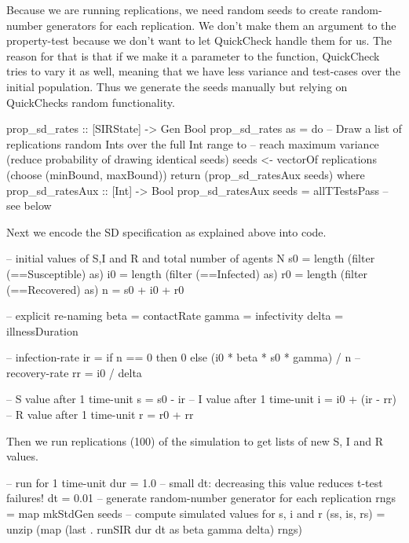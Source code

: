 Because we are running replications, we need random seeds to create random-number generators for each replication. We don't make them an argument to the property-test because we don't want to let QuickCheck handle them for us. The reason for that is that if we make it a parameter to the function, QuickCheck tries to vary it as well, meaning that we have less variance and test-cases over the initial population. Thus we generate the seeds manually but relying on QuickChecks random functionality.

\begin{HaskellCode}
prop_sd_rates :: [SIRState] -> Gen Bool
prop_sd_rates as = do
    -- Draw a list of replications random Ints over the full Int range to  
    -- reach maximum variance (reduce probability of drawing identical seeds)
    seeds <- vectorOf replications (choose (minBound, maxBound))
    return (prop_sd_ratesAux seeds)
  where
    prop_sd_ratesAux :: [Int] -> Bool
    prop_sd_ratesAux seeds = allTTestsPass -- see below
\end{HaskellCode}

Next we encode the SD specification as explained above into code.

\begin{HaskellCode}
-- initial values of S,I and R and total number of agents N
s0 = length (filter (==Susceptible) as)
i0 = length (filter (==Infected) as)
r0 = length (filter (==Recovered) as)
n  = s0 + i0 + r0

-- explicit re-naming
beta  = contactRate
gamma = infectivity
delta = illnessDuration

-- infection-rate
ir = if n == 0 then 0 else (i0 * beta * s0 * gamma) / n
-- recovery-rate 
rr = i0 / delta

-- S value after 1 time-unit 
s = s0 - ir
-- I value after 1 time-unit
i = i0 + (ir - rr)
-- R value after 1 time-unit
r = r0 + rr
\end{HaskellCode}

Then we run replications (100) of the simulation to get lists of new S, I and R values.

\begin{HaskellCode}
-- run for 1 time-unit
dur = 1.0
-- small dt: decreasing this value reduces t-test failures!
dt = 0.01
-- generate random-number generator for each replication
rngs = map mkStdGen seeds
-- compute simulated values for s, i and r
(ss, is, rs) = unzip (map (last . runSIR dur dt as beta gamma delta) rngs)
\end{HaskellCode}

